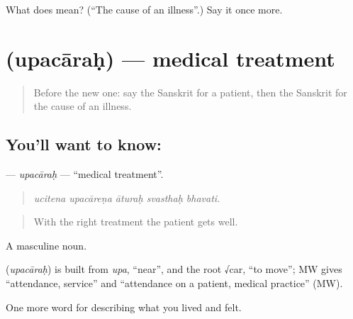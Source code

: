\begin{tcolorbox}[breakable,colback=teal!4,colframe=teal!35!black,title={Before you move on}]
What does  mean? (\textquotedblleft{}The cause of an illness\textquotedblright{}.) Say it once more.
\end{tcolorbox}
\section[\texorpdfstring{\sk{उपचारः} (upacāraḥ)}{उपचारः (upacāraḥ)}]{ (upacāraḥ) — medical treatment}

\label{lesson:SA-C482-upacarah}



\begin{quote}
Before the new one: say the Sanskrit for a patient, then the Sanskrit for the cause of an illness.
\end{quote}

\subsection*{You'll want to know: }
\textbf{} — \emph{upacāraḥ} — \textquotedblleft{}medical treatment\textquotedblright{}.

\begin{quote}
    
\end{quote}

\begin{quote}
\emph{ucitena upacāreṇa āturaḥ svasthaḥ bhavati.}
\end{quote}

\begin{quote}
With the right treatment the patient gets well.
\end{quote}

A masculine noun.

\begin{cousinweb}
\textbf{} (\emph{upacāraḥ}) is built from \emph{upa}, \textquotedblleft{}near\textquotedblright{}, and the root √car, \textquotedblleft{}to move\textquotedblright{}; MW gives \textquotedblleft{}attendance, service\textquotedblright{} and \textquotedblleft{}attendance on a patient, medical practice\textquotedblright{} (MW).
\end{cousinweb}

\begin{grammarlens}[title={What you've built}]
One more word for describing what you lived and felt.
\end{grammarlens}

